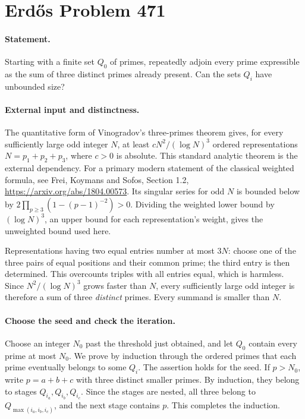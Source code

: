 \section*{Erd\H{o}s Problem 471}

\paragraph{Statement.}
Starting with a finite set \(Q_0\) of primes, repeatedly adjoin every
prime expressible as the sum of three distinct primes already present.
Can the sets \(Q_i\) have unbounded size?

\paragraph{External input and distinctness.}
The quantitative form of Vinogradov's three-primes theorem gives,
for every sufficiently large odd integer \(N\), at least
\(cN^2/(\log N)^3\) ordered representations \(N=p_1+p_2+p_3\),
where \(c>0\) is absolute. This standard analytic theorem is the
external dependency.
For a primary modern statement of the classical weighted formula, see
Frei, Koymans and Sofos, Section 1.2,
\url{https://arxiv.org/abs/1804.00573}.
Its singular series for odd \(N\) is bounded below by
\(2\prod_{p\geq3}(1-(p-1)^{-2})>0\).
Dividing the weighted lower bound by \((\log N)^3\), an upper bound
for each representation's weight, gives the unweighted bound used here.

Representations having two equal entries number at most \(3N\):
choose one of the three pairs of equal positions and their common
prime; the third entry is then determined. This overcounts triples
with all entries equal, which is harmless.
Since \(N^2/(\log N)^3\) grows faster than \(N\), every sufficiently
large odd integer is therefore a sum of three \emph{distinct} primes.
Every summand is smaller than \(N\).

\paragraph{Choose the seed and check the iteration.}
Choose an integer \(N_0\) past the threshold just obtained, and let
\(Q_0\) contain every prime at most \(N_0\).
We prove by induction through the ordered primes that each prime
eventually belongs to some \(Q_i\).
The assertion holds for the seed. If \(p>N_0\), write \(p=a+b+c\)
with three distinct smaller primes. By induction, they belong to
stages \(Q_{i_a},Q_{i_b},Q_{i_c}\).
Since the stages are nested, all three belong to
\(Q_{\max(i_a,i_b,i_c)}\), and the next stage contains \(p\).
This completes the induction.

